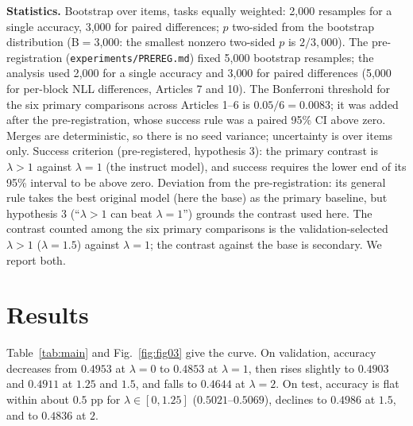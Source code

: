 \documentclass[conference]{IEEEtran}
\begin{document}
\textbf{Statistics.} Bootstrap over items, tasks equally weighted: 2{,}000 resamples for a single accuracy, 3{,}000 for paired differences; $p$ two-sided from the bootstrap distribution (B$=$3{,}000: the smallest nonzero two-sided $p$ is $2/3{,}000$). The pre-registration (\texttt{experiments/PREREG.md}) fixed 5{,}000 bootstrap resamples; the analysis used 2{,}000 for a single accuracy and 3{,}000 for paired differences (5{,}000 for per-block NLL differences, Articles 7 and 10). The Bonferroni threshold for the six primary comparisons across Articles 1--6 is $0.05/6=0.0083$; it was added after the pre-registration, whose success rule was a paired 95\% CI above zero. Merges are deterministic, so there is no seed variance; uncertainty is over items only. Success criterion (pre-registered, hypothesis 3): the primary contrast is $\lambda>1$ against $\lambda=1$ (the instruct model), and success requires the lower end of its 95\% interval to be above zero. Deviation from the pre-registration: its general rule takes the best original model (here the base) as the primary baseline, but hypothesis 3 (``$\lambda>1$ can beat $\lambda=1$'') grounds the contrast used here. The contrast counted among the six primary comparisons is the validation-selected $\lambda>1$ ($\lambda=1.5$) against $\lambda=1$; the contrast against the base is secondary. We report both.

\section{Results}\label{sec:results}
Table~\ref{tab:main} and Fig.~\ref{fig:fig03} give the curve. On validation, accuracy decreases from $0.4953$ at $\lambda=0$ to $0.4853$ at $\lambda=1$, then rises slightly to $0.4903$ and $0.4911$ at $1.25$ and $1.5$, and falls to $0.4644$ at $\lambda=2$. On test, accuracy is flat within about $0.5$ pp for $\lambda\in[0,1.25]$ ($0.5021$--$0.5069$), declines to $0.4986$ at $1.5$, and to $0.4836$ at $2$.
\end{document}
